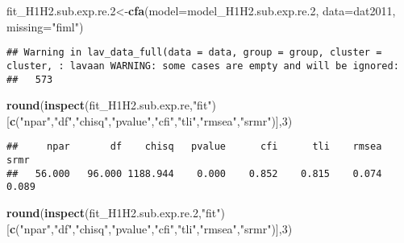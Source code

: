 \documentclass[
]{article}
\newenvironment{Shaded}{\begin{snugshade}}{\end{snugshade}}
\newcommand{\DataTypeTok}[1]{\textcolor[rgb]{0.13,0.29,0.53}{#1}}
\newcommand{\DecValTok}[1]{\textcolor[rgb]{0.00,0.00,0.81}{#1}}
\newcommand{\FloatTok}[1]{\textcolor[rgb]{0.00,0.00,0.81}{#1}}
\newcommand{\KeywordTok}[1]{\textcolor[rgb]{0.13,0.29,0.53}{\textbf{#1}}}
\newcommand{\NormalTok}[1]{#1}
\newcommand{\StringTok}[1]{\textcolor[rgb]{0.31,0.60,0.02}{#1}}
\begin{document}
\begin{Shaded}
\begin{Highlighting}[]
\NormalTok{fit_H1H2.sub.exp.re}\FloatTok{.2}\NormalTok{<-}\KeywordTok{cfa}\NormalTok{(}\DataTypeTok{model=}\NormalTok{model_H1H2.sub.exp.re}\FloatTok{.2}\NormalTok{,}
              \DataTypeTok{data=}\NormalTok{dat2011,}
              \DataTypeTok{missing=}\StringTok{"fiml"}\NormalTok{)}
\end{Highlighting}
\end{Shaded}

\begin{verbatim}
## Warning in lav_data_full(data = data, group = group, cluster = cluster, : lavaan WARNING: some cases are empty and will be ignored:
##   573
\end{verbatim}

\begin{Shaded}
\begin{Highlighting}[]
\KeywordTok{round}\NormalTok{(}\KeywordTok{inspect}\NormalTok{(fit_H1H2.sub.exp.re,}\StringTok{"fit"}\NormalTok{)}
\NormalTok{      [}\KeywordTok{c}\NormalTok{(}\StringTok{"npar"}\NormalTok{,}\StringTok{"df"}\NormalTok{,}\StringTok{"chisq"}\NormalTok{,}\StringTok{"pvalue"}\NormalTok{,}\StringTok{"cfi"}\NormalTok{,}\StringTok{"tli"}\NormalTok{,}\StringTok{"rmsea"}\NormalTok{,}\StringTok{"srmr"}\NormalTok{)],}\DecValTok{3}\NormalTok{)}
\end{Highlighting}
\end{Shaded}

\begin{verbatim}
##     npar       df    chisq   pvalue      cfi      tli    rmsea     srmr 
##   56.000   96.000 1188.944    0.000    0.852    0.815    0.074    0.089
\end{verbatim}

\begin{Shaded}
\begin{Highlighting}[]
\KeywordTok{round}\NormalTok{(}\KeywordTok{inspect}\NormalTok{(fit_H1H2.sub.exp.re}\FloatTok{.2}\NormalTok{,}\StringTok{"fit"}\NormalTok{)}
\NormalTok{      [}\KeywordTok{c}\NormalTok{(}\StringTok{"npar"}\NormalTok{,}\StringTok{"df"}\NormalTok{,}\StringTok{"chisq"}\NormalTok{,}\StringTok{"pvalue"}\NormalTok{,}\StringTok{"cfi"}\NormalTok{,}\StringTok{"tli"}\NormalTok{,}\StringTok{"rmsea"}\NormalTok{,}\StringTok{"srmr"}\NormalTok{)],}\DecValTok{3}\NormalTok{)}
\end{Highlighting}
\end{Shaded}
\end{document}
